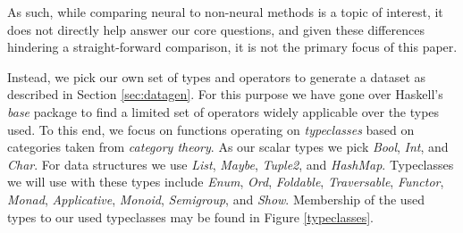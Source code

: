 \documentclass{article}
\begin{document}



As such, while comparing neural to non-neural methods is a topic of interest,
it does not directly help answer our core questions,
and given
these differences hindering a straight-forward comparison,
it is not the primary focus of this paper.

Instead, we pick our own set of types and operators to generate a dataset as described in Section \ref{sec:datagen}.
For this purpose we have gone over Haskell's \emph{base} package to find a limited set of operators widely applicable over the types used.
To this end, we focus on functions operating on \emph{typeclasses} based on categories taken from \emph{category theory}.
As our scalar types we pick \emph{Bool}, \emph{Int}, and \emph{Char}.
For data structures we use \emph{List}, \emph{Maybe}, \emph{Tuple2}, and \emph{HashMap}.
Typeclasses we will use with these types include \emph{Enum}, \emph{Ord}, \emph{Foldable}, \emph{Traversable}, \emph{Functor}, \emph{Monad}, \emph{Applicative},
\emph{Monoid}, \emph{Semigroup}, and \emph{Show}.
Membership of the used types to our used typeclasses may be found in Figure \ref{typeclasses}.
\end{document}
